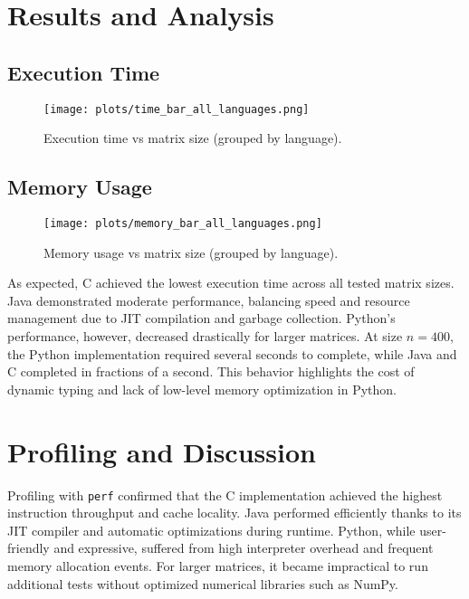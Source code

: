 \documentclass[12pt,a4paper]{article}
\begin{document}
\section{Results and Analysis}
\subsection{Execution Time}
\begin{figure}[H]
\centering
\texttt{[image: plots/time\_bar\_all\_languages.png]}
\caption{Execution time vs matrix size (grouped by language).}
\label{fig:time_bar}
\end{figure}

\subsection{Memory Usage}
\begin{figure}[H]
\centering
\texttt{[image: plots/memory\_bar\_all\_languages.png]}
\caption{Memory usage vs matrix size (grouped by language).}
\label{fig:memory_bar}
\end{figure}

As expected, C achieved the lowest execution time across all tested matrix sizes. Java demonstrated moderate performance, balancing speed and resource management due to JIT compilation and garbage collection. Python’s performance, however, decreased drastically for larger matrices.  
At size $n=400$, the Python implementation required several seconds to complete, while Java and C completed in fractions of a second. This behavior highlights the cost of dynamic typing and lack of low-level memory optimization in Python.

\section{Profiling and Discussion}
Profiling with \texttt{perf} confirmed that the C implementation achieved the highest instruction throughput and cache locality. Java performed efficiently thanks to its JIT compiler and automatic optimizations during runtime.  
Python, while user-friendly and expressive, suffered from high interpreter overhead and frequent memory allocation events. For larger matrices, it became impractical to run additional tests without optimized numerical libraries such as NumPy.
\end{document}
